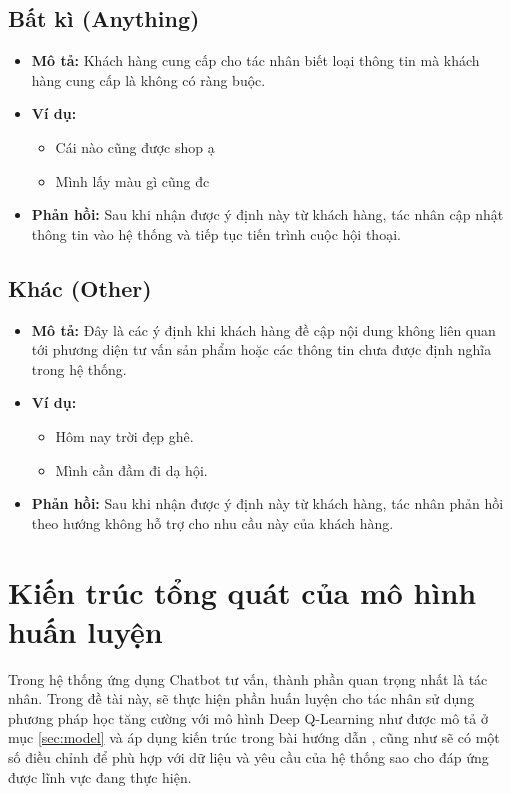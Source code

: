 \subsection{Bất kì (Anything)}
\begin{itemize}
    \item \textbf{Mô tả:} Khách hàng cung cấp cho tác nhân biết loại
    thông tin mà khách hàng cung cấp là không có ràng buộc.
    \item \textbf{Ví dụ:}
    \begin{itemize}
        \item Cái nào cũng được shop ạ
        \item Mình lấy màu gì cũng đc
    \end{itemize}
    \item \textbf{Phản hồi:} Sau khi nhận được ý định này từ
    khách hàng, tác nhân cập nhật thông tin vào hệ thống và
    tiếp tục tiến trình cuộc hội thoại.
\end{itemize}

\subsection{Khác (Other)}
\begin{itemize}
    \item \textbf{Mô tả:} Đây là các ý định khi khách hàng đề cập
    nội dung không liên quan tới phương diện tư vấn sản phẩm hoặc
    các thông tin chưa được định nghĩa trong hệ thống.
    \item \textbf{Ví dụ:}
    \begin{itemize}
        \item Hôm nay trời đẹp ghê.
        \item Mình cần đầm đi dạ hội.
    \end{itemize}
    \item \textbf{Phản hồi:} Sau khi nhận được ý định này từ
    khách hàng, tác nhân phản hồi theo hướng không hỗ trợ cho
    nhu cầu này của khách hàng.
\end{itemize}

\section{Kiến trúc tổng quát của mô hình huấn luyện}
\label{sec:trainingmodel}
Trong hệ thống ứng dụng Chatbot tư vấn, thành phần quan trọng nhất
là tác nhân. Trong đề tài này, sẽ thực hiện phần huấn luyện cho
tác nhân sử dụng phương pháp học tăng cường với mô hình Deep
Q-Learning như được mô tả ở mục \ref{sec:model} và áp dụng kiến trúc
trong bài hướng dẫn \cite{traininggochatbot}, cũng như sẽ có một số
điều chỉnh để phù hợp với dữ liệu và yêu cầu của hệ thống sao cho
đáp ứng được lĩnh vực đang thực hiện.

